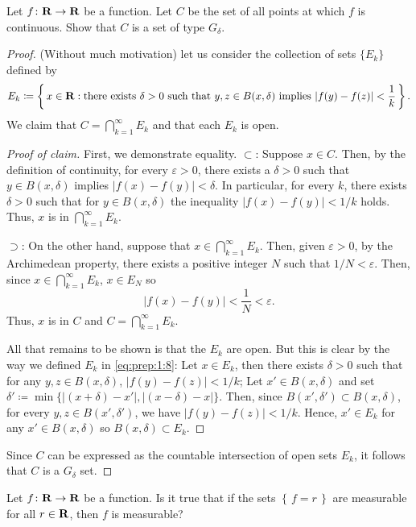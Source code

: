 \begin{problem}
Let $f\colon\mathbf{R}\to\mathbf{R}$ be a function. Let $C$ be the set of all points
at which $f$ is continuous. Show that $C$ is a set of type $G_\delta$.
\end{problem}
\begin{proof}
(Without much motivation) let us consider the collection of sets $\{E_k\}$
defined by
\begin{equation}
\label{eq:prep:1:8}
E_k\coloneqq\left\{\,x\in\mathbf{R}:
\text{there exists $\delta>0$ such that $y,z\in B(x,\delta)$ implies $\left|f(y)-f(z)\right|<\frac{1}{k}$}\,\right\}.
\end{equation}
We claim that $C=\bigcap_{k=1}^\infty E_k$ and that each $E_k$ is open.
\begin{proof}[Proof of claim]
\renewcommand{\qedsymbol}{$\clubsuit$}
First, we demonstrate equality. $\subset$: Suppose $x\in C$. Then, by the
definition of continuity, for every $\varepsilon>0$, there exists a
$\delta>0$ such that $y\in B(x,\delta)$ implies $|f(x)-f(y)|<\delta$. In
particular, for every $k$, there exists $\delta>0$ such that for $y\in
B(x,\delta)$ the inequality $|f(x)-f(y)|<1/k$ holds. Thus, $x$ is in
$\bigcap_{k=1}^\infty E_k$.

$\supset$: On the other hand, suppose that $x\in\bigcap_{k=1}^\infty
E_k$. Then, given $\varepsilon>0$, by the Archimedean property, there
exists a positive integer $N$ such that $1/N<\varepsilon$. Then, since
$x\in\bigcap_{k=1}^\infty E_k$, $x\in E_N$ so
\begin{equation}
  \label{eq:prep:1:9}
|f(x)-f(y)|<\frac{1}{N}<\varepsilon.
\end{equation}
Thus, $x$ is in $C$ and $C=\bigcap_{k=1}^\infty E_k$.

All that remains to be shown is that the $E_k$ are open. But this is clear
by the way we defined $E_k$ in \eqref{eq:prep:1:8}: Let $x\in E_k$, then
there exists $\delta>0$ such that for any $y,z\in B(x,\delta)$,
$|f(y)-f(z)|<1/k$; Let $x'\in B(x,\delta)$ and set
$\delta'\coloneqq\min\{|(x+\delta)-x'|,|(x-\delta)-x|\}$. Then, since
$B(x',\delta')\subset B(x,\delta)$, for every $y,z\in B(x',\delta')$, we
have $|f(y)-f(z)|<1/k$. Hence, $x'\in E_k$ for any $x'\in B(x,\delta)$
so $B(x,\delta)\subset E_k$.
\end{proof}
Since $C$ can be expressed as the countable intersection of open sets
$E_k$, it follows that $C$ is a $G_\delta$ set.
\end{proof}
\begin{problem}
Let $f\colon\mathbf{R}\to\mathbf{R}$ be a function. Is it true that if the sets
$\left\{\,f=r\,\right\}$ are measurable for all $r\in\mathbf{R}$, then $f$ is
measurable?
\end{problem}
